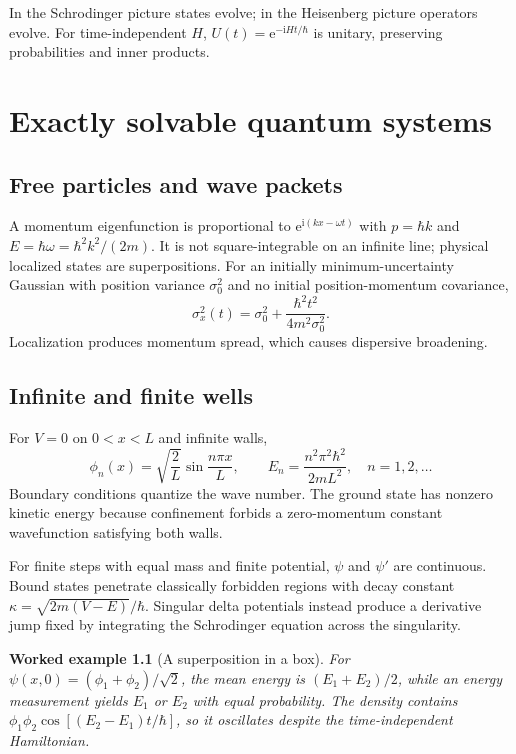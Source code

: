 \documentclass[11pt,oneside]{book}
\newcommand{\ii}{\mathrm{i}}
\newcommand{\ee}{\mathrm{e}}
\theoremstyle{reviewstyle}
\newtheorem{example}{Worked example}[chapter]
\begin{document}
In the Schrodinger picture states evolve; in the Heisenberg picture operators evolve. For time-independent $H$, $U(t)=\ee^{-\ii Ht/\hbar}$ is unitary, preserving probabilities and inner products.

\chapter{Exactly solvable quantum systems}
\section{Free particles and wave packets}
A momentum eigenfunction is proportional to $\ee^{\ii(kx-\omega t)}$ with $p=\hbar k$ and $E=\hbar\omega=\hbar^2k^2/(2m)$. It is not square-integrable on an infinite line; physical localized states are superpositions. For an initially minimum-uncertainty Gaussian with position variance $\sigma_0^2$ and no initial position-momentum covariance,
\begin{equation}\sigma_x^2(t)=\sigma_0^2+\frac{\hbar^2t^2}{4m^2\sigma_0^2}.\end{equation}
Localization produces momentum spread, which causes dispersive broadening.
\section{Infinite and finite wells}
For $V=0$ on $0<x<L$ and infinite walls,
\begin{equation}\phi_n(x)=\sqrt{\frac2L}\sin\frac{n\pi x}{L},\qquad E_n=\frac{n^2\pi^2\hbar^2}{2mL^2},\quad n=1,2,\ldots\end{equation}
Boundary conditions quantize the wave number. The ground state has nonzero kinetic energy because confinement forbids a zero-momentum constant wavefunction satisfying both walls.

For finite steps with equal mass and finite potential, $\psi$ and $\psi'$ are continuous. Bound states penetrate classically forbidden regions with decay constant $\kappa=\sqrt{2m(V-E)}/\hbar$. Singular delta potentials instead produce a derivative jump fixed by integrating the Schrodinger equation across the singularity.
\begin{example}[A superposition in a box]
For $\psi(x,0)=(\phi_1+\phi_2)/\sqrt2$, the mean energy is $(E_1+E_2)/2$, while an energy measurement yields $E_1$ or $E_2$ with equal probability. The density contains $\phi_1\phi_2\cos[(E_2-E_1)t/\hbar]$, so it oscillates despite the time-independent Hamiltonian.
\end{example}
\end{document}
